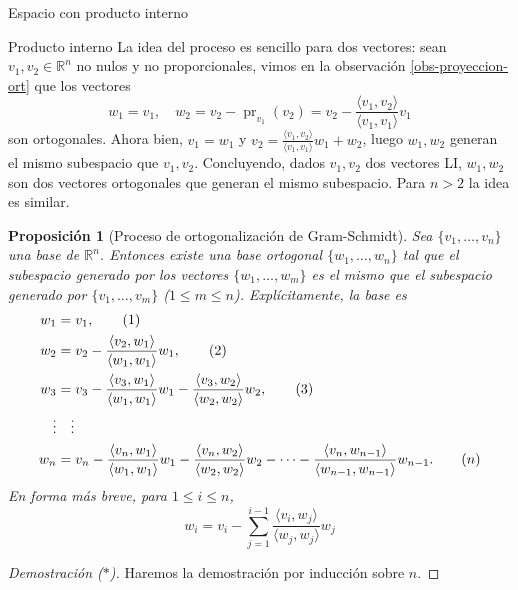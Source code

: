 \documentclass[a4paper,12pt,twoside,spanish,reqno]{amsbook}
\newtheorem{proposicion}[teorema]{Proposici\'on}
\theoremstyle{definition}
\theoremstyle{remark}
\newcommand{\la}{\langle}
\newcommand{\ra}{\rangle}
\newcommand{\R}{\mathbb R}
\begin{document}
\begin{chapter}{Espacio con producto interno}
\begin{section}{Producto interno}
        La idea del proceso es sencillo para dos vectores: sean  $v_1,v_2 \in \R^n$ no  nulos y no proporcionales, vimos en la observación \ref{obs-proyeccion-ort} que  los vectores
        \begin{equation*}
            w_1 = v_1, \quad w_2 = v_2 - \operatorname{pr}_{v_1}(v_2) = v_2 - \frac{\la v_1,v_2\ra}{\la v_1,v_1\ra}v_1
        \end{equation*}
        son ortogonales. Ahora bien, $v_1 = w_1$ y $v_2  = \frac{\la v_1,v_2\ra}{\la v_1,v_1\ra}w_1 + w_2$, luego  $w_1,w_2$ generan el mismo subespacio que $v_1,v_2$. Concluyendo, dados  $v_1,v_2$ dos vectores LI, $w_1,w_2$ son dos vectores ortogonales que generan el mismo subespacio. Para $n >2$ la idea es similar. 
        
        \medskip 
        
        
        
        \begin{proposicion}[Proceso de ortogonalización de Gram-Schmidt]
            Sea $\{v_1,\ldots,v_n\}$ una base de $\R^n$. Entonces existe una base ortogonal $\{w_1,\ldots, w_n\}$ tal que el subespacio generado por los vectores $\{w_1,\ldots, w_m\}$ es el mismo que el subespacio generado por $\{v_1,\ldots, v_m\}$ ($1\le m \le n$). Explícitamente, la base es
            \begin{align}
            w_1 &= v_1, \tag{1} \\
            w_2 &= v_2 - \frac{\la v_2,w_1\ra}{\la w_1,w_1\ra}w_1, \tag{2}\\
            w_3 &= v_3 - \frac{\la v_3,w_1\ra}{\la w_1,w_1\ra}w_1- \frac{\la v_3,w_2\ra}{\la w_2,w_2\ra}w_2,\tag{3} \\
            \vdots &\quad \vdots \notag \\
            w_n &= v_n - \frac{\la v_n,w_1\ra}{\la w_1,w_1\ra}w_1- \frac{\la v_n,w_2\ra}{\la w_2,w_2\ra}w_2 - \cdots - \frac{\la v_n,w_{n-1}\ra}{\la w_{n-1},w_{n-1}\ra}w_{n-1}.\tag{$n$}	
            \end{align}
            En forma más breve, para $1 \le i \le n$, 
            \begin{equation}
            w_i = v_i - \sum_{j = 1}^{i-1} \frac{\la v_i,w_{j}\ra}{\la w_{j},w_{j}\ra}w_{j} \tag{$i$}
            \end{equation}
        \end{proposicion} 
        \begin{proof}[Demostración ($*$)]
            
            
            Haremos la demostración por inducción sobre $n$. 
            

\end{proof}
\end{section}
\end{chapter}
\end{document}

